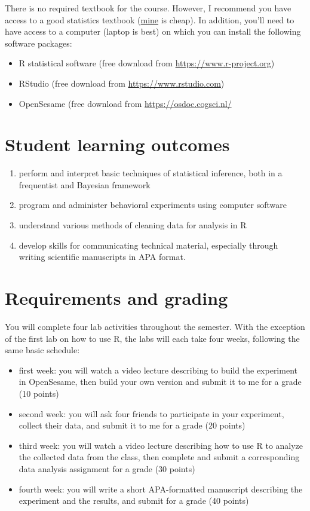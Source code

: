 \documentclass[10pt]{article}
\begin{document}
There is no required textbook for the course. However, I recommend you have access to a good statistics textbook (\href{https://www.amazon.com/Psychological-Statistics-Basics-Thomas-Faulkenberry-dp-1032020954/dp/1032020954}{mine} is cheap).  In addition, you'll need to have access to a computer (laptop is best) on which you can install the following software packages:

\begin{itemize}
\item R statistical software (free download from \href{http://www.r-project.org}{https://www.r-project.org})
\item RStudio (free download from \href{http://www.rstudio.com}{https://www.rstudio.com})
\item OpenSesame (free download from \url{https://osdoc.cogsci.nl/}
\end{itemize}

\section*{Student learning outcomes}
\label{sec:orgc9545b5}

\begin{enumerate}
\item perform and interpret basic techniques of statistical inference, both in a frequentist and Bayesian framework
\item program and administer behavioral experiments using computer software
\item understand various methods of cleaning data for analysis in R
\item develop skills for communicating technical material, especially through writing scientific manuscripts in APA format.
\end{enumerate}

\section*{Requirements and grading}
\label{sec:org27cfb73}

You will complete four lab activities throughout the semester. With the exception of the first lab on how to use R, the labs will each take four weeks, following the same basic schedule:

\begin{itemize}
\item first week: you will watch a video lecture describing to build the experiment in OpenSesame, then build your own version and submit it to me for a grade (10 points)
\item second week: you will ask four friends to participate in your experiment, collect their data, and submit it to me for a grade (20 points)
\item third week: you will watch a video lecture describing how to use R to analyze the collected data from the class, then complete and submit a corresponding data analysis assignment for a grade (30 points)
\item fourth week: you will write a short APA-formatted manuscript describing the experiment and the results, and submit for a grade (40 points)
\end{itemize}
\end{document}

